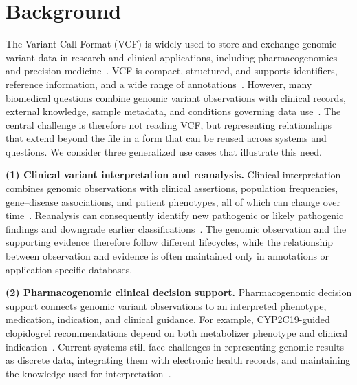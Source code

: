 \documentclass[pdflatex,sn-mathphys-num,referee]{sn-jnl}
\begin{document}
\section{Background}\label{sec:background}
The Variant Call Format (VCF) is widely used to store and exchange genomic variant data in research and clinical applications, including pharmacogenomics and precision medicine~\cite{vcf_spec_2024,pharmcat,souche_recommendations_2022}.
VCF is compact, structured, and supports identifiers, reference information, and a wide range of annotations~\cite{vcf_spec_2024,BCFtools}.
However, many biomedical questions combine genomic variant observations with clinical records, external knowledge, sample metadata, and conditions governing data use~\cite{gottesman2013emerge,allofus2024genomic,rehm2021ga4gh}.
The central challenge is therefore not reading VCF, but representing relationships that extend beyond the file in a form that can be reused across systems and questions.
We consider three generalized use cases that illustrate this need.

\textbf{(1) Clinical variant interpretation and reanalysis.}\label{uc:reanalysis}
Clinical interpretation combines genomic observations with clinical assertions, population frequencies, gene--disease associations, and patient phenotypes, all of which can change over time~\cite{richards2015standards,deignan2019reevaluation}.
Reanalysis can consequently identify new pathogenic or likely pathogenic findings and downgrade earlier classifications~\cite{hiatt2018systematic}.
The genomic observation and the supporting evidence therefore follow different lifecycles, while the relationship between observation and evidence is often maintained only in annotations or application-specific databases.

\textbf{(2) Pharmacogenomic clinical decision support.}\label{uc:pgx}
Pharmacogenomic decision support connects genomic variant observations to an interpreted phenotype, medication, indication, and clinical guidance.
For example, CYP2C19-guided clopidogrel recommendations depend on both metabolizer phenotype and clinical indication~\cite{lee2022clopidogrel}.
Current systems still face challenges in representing genomic results as discrete data, integrating them with electronic health records, and maintaining the knowledge used for interpretation~\cite{wake2022pgx,johnson2024genetically}.
\end{document}
